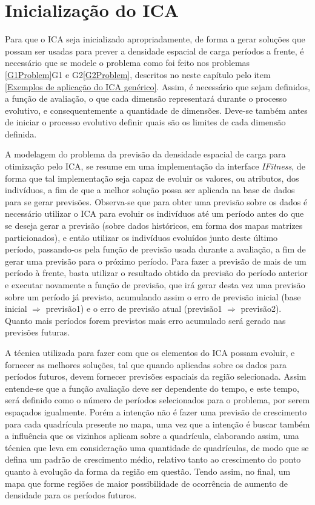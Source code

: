 \section{Inicialização do ICA}

Para que o ICA seja inicializado apropriadamente, de forma a gerar soluções que possam ser usadas para prever a densidade espacial de carga períodos a frente, é necessário que se modele o problema como foi feito nos problemas \ref{G1Problem}G1 e G2\ref{G2Problem}, descritos no neste capítulo pelo item \ref{Exemplos de aplicação do ICA genérico}. Assim, é necessário que sejam definidos, a função de avaliação, o que cada dimensão representará durante o processo evolutivo, e consequentemente a quantidade de dimensões. Deve-se também antes de iniciar o processo evolutivo definir quais são os limites de cada dimensão definida.

A modelagem do problema da previsão da densidade espacial de carga para otimização pelo ICA, se resume em uma implementação da interface \emph{IFitness}, de forma que tal implementação seja capaz de evoluir os valores, ou atributos, dos indivíduos, a fim de que a melhor solução possa ser aplicada na base de dados para se gerar previsões. Observa-se que para obter uma previsão sobre os dados é necessário utilizar o ICA para evoluir os indivíduos até um período antes do que se deseja gerar a previsão (sobre dados históricos, em forma dos mapas matrizes particionados), e então utilizar os indivíduos evoluídos junto deste último período, passando-os pela função de previsão usada durante a avaliação, a fim de gerar uma previsão para o próximo período. Para fazer a previsão de mais de um período à frente, basta utilizar o resultado obtido da previsão do período anterior e executar novamente a função de previsão, que irá gerar desta vez uma previsão sobre um período já previsto, acumulando assim o erro de previsão inicial (base inicial \(\Rightarrow\) previsão1) e o erro de previsão atual (previsão1 \(\Rightarrow\) previsão2). Quanto mais períodos forem previstos mais erro acumulado será gerado nas previsões futuras.

A técnica utilizada para fazer com que os elementos do ICA possam evoluir, e fornecer as melhores soluções, tal que quando aplicadas sobre os dados para períodos futuros, devem fornecer previsões espaciais da região selecionada. Assim  entende-se que a função avaliação deve ser dependente do tempo, e este tempo, será definido como o número de períodos selecionados para o problema, por serem espaçados igualmente. Porém a intenção não é fazer uma previsão de crescimento para cada quadrícula presente no mapa, uma vez que a intenção é buscar também a influência que os vizinhos aplicam sobre a quadrícula, elaborando assim, uma técnica que leva em consideração uma quantidade de quadrículas, de modo que se defina um padrão de crescimento médio, relativo tanto ao crescimento do ponto quanto à evolução da forma da região em questão. Tendo assim, no final, um mapa que forme regiões de maior possibilidade de ocorrência de aumento de densidade para os períodos futuros.

